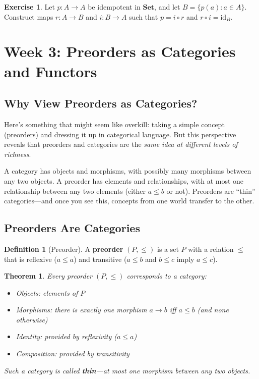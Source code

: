 \documentclass[11pt]{article}
\newcommand{\cat}[1]{\mathbf{#1}}
\newcommand{\Set}{\cat{Set}}
\newcommand{\id}{\mathrm{id}}
\theoremstyle{definition}
\newtheorem{definition}{Definition}[section]
\newtheorem{exercise}{Exercise}[section]
\theoremstyle{plain}
\newtheorem{theorem}{Theorem}[section]
\theoremstyle{remark}
\begin{document}
\begin{exercise}
Let $p: A \to A$ be idempotent in $\Set$, and let $B = \{p(a) : a \in A\}$.
Construct maps $r: A \to B$ and $i: B \to A$ such that $p = i \circ r$ and $r \circ i = \id_B$.
\end{exercise}

\section{Week 3: Preorders as Categories and Functors}

\subsection*{Why View Preorders as Categories?}

Here's something that might seem like overkill: taking a simple concept (preorders) and dressing it up in categorical language. But this perspective reveals that preorders and categories are the \emph{same idea at different levels of richness}.

A category has objects and morphisms, with possibly many morphisms between any two objects. A preorder has elements and relationships, with at most one relationship between any two elements (either $a \leq b$ or not). Preorders are ``thin'' categories---and once you see this, concepts from one world transfer to the other.

\subsection{Preorders Are Categories}

\begin{definition}[Preorder]
A \textbf{preorder} $(P, \leq)$ is a set $P$ with a relation $\leq$ that is reflexive ($a \leq a$) and transitive ($a \leq b$ and $b \leq c$ imply $a \leq c$).
\end{definition}

\begin{theorem}
Every preorder $(P, \leq)$ corresponds to a category:
\begin{itemize}
  \item Objects: elements of $P$
  \item Morphisms: there is exactly one morphism $a \to b$ iff $a \leq b$ (and none otherwise)
  \item Identity: provided by reflexivity ($a \leq a$)
  \item Composition: provided by transitivity
\end{itemize}
Such a category is called \textbf{thin}---at most one morphism between any two objects.
\end{theorem}
\end{document}
